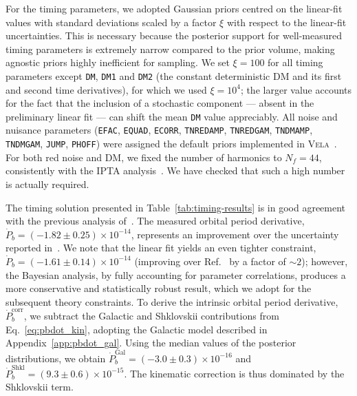 \documentclass[
    floats,
    floatfix,
    amssymb,
    prd,
    twocolumn,
    superscriptaddress,
    nofootinbib,
    unicode,
    colorlinks=true,
    linktocpage=true
]{revtex4-2}
\begin{document}
For the timing parameters, we adopted Gaussian priors centred on the 
linear-fit values with standard deviations scaled by a factor $\xi$ 
with respect to the linear-fit uncertainties. This is necessary because 
the posterior support for well-measured timing parameters is extremely 
narrow compared to the prior volume, making agnostic priors highly 
inefficient for sampling. We set $\xi = 100$ for all timing parameters 
except \texttt{DM}, \texttt{DM1} and \texttt{DM2} (the constant deterministic DM and its first and second time derivatives), for which we used $\xi = 10^{4}$; the larger value 
accounts for the fact that the inclusion of a stochastic component 
--- absent in the preliminary linear fit --- can shift the mean \texttt{DM} 
value appreciably. All noise and nuisance parameters (\texttt{EFAC}, 
\texttt{EQUAD}, \texttt{ECORR}, \texttt{TNREDAMP}, \texttt{TNREDGAM}, 
\texttt{TNDMAMP}, \texttt{TNDMGAM}, \texttt{JUMP}, \texttt{PHOFF}) 
were assigned the default priors implemented in \textsc{Vela}~\cite{Susobhanan:2024yef}. For both red noise and DM, we fixed the number of harmonics to $N_f=44$, consistently with the IPTA analysis~\cite{Antoniadis:2022pcn}. We have checked that such a high number is actually required. 

The timing solution presented in Table~\ref{tab:timing-results} is in good 
agreement with the previous analysis of~\cite{Freire:2012}. The measured 
orbital period derivative, $\dot{P}_b = (-1.82 \pm 0.25) \times 10^{-14}$,
represents an improvement over the uncertainty reported
in~\cite{Freire:2012}. We note that the linear fit yields an even tighter 
constraint, $\dot{P}_b = (-1.61 \pm 0.14) \times 10^{-14}$ (improving over Ref.~\cite{Freire:2012} by a factor of $\sim2$); however, 
the Bayesian analysis, by fully accounting for parameter correlations, 
produces a more conservative and statistically robust result, which we 
adopt for the subsequent theory constraints. To derive the intrinsic orbital period derivative, $\dot{P}^{\mathrm{corr}}_b$, we subtract the Galactic and Shklovskii contributions from Eq.~\eqref{eq:pbdot_kin}, adopting the Galactic model described in Appendix~\ref{app:pbdot_gal}.
Using the median values of the posterior distributions, we obtain $\dot{P}_b^{\mathrm{Gal}} = (-3.0 \pm 0.3)\times 10^{-16}$ and $\dot{P}_b^{\mathrm{Shkl}} = (9.3 \pm 0.6)\times 10^{-15}$. The kinematic correction is thus dominated by the Shklovskii term.
\end{document}
